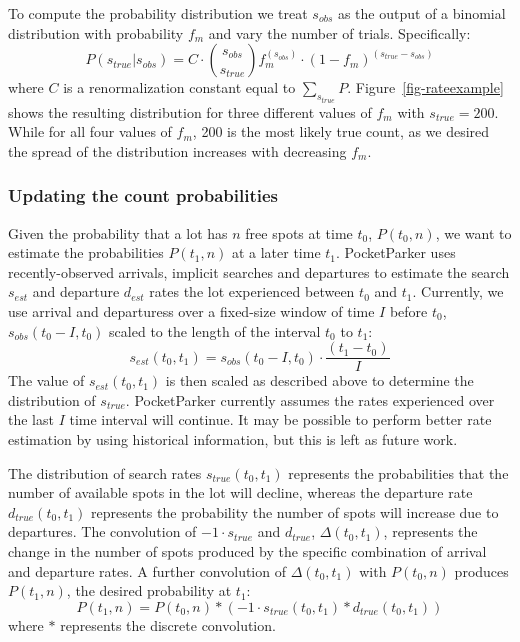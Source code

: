 To compute the probability distribution we treat $s_{obs}$ as the output of a
binomial distribution with probability $f_m$ and vary the number of trials.
Specifically:
%
\begin{equation} P(s_{true}| s_{obs}) = C \cdot {s_{obs} \choose s_{true}}
f_m^{(s_{obs})} \cdot (1 - f_m)^{(s_{true} - s_{obs})} \end{equation}
%
where $C$ is a renormalization constant equal to $\sum_{s_{true}} P$.
Figure~\ref{fig-rateexample} shows the resulting distribution for three
different values of $f_m$ with $s_{true} = 200$. While for all four values of
$f_m$, 200 is the most likely true count, as we desired the spread of the
distribution increases with decreasing $f_m$.

\subsubsection{Updating the count probabilities}

Given the probability that a lot has $n$ free spots at time $t_0$, $P(t_0,
n)$, we want to estimate the probabilities $P(t_1, n)$ at a later time $t_1$.
PocketParker uses recently-observed arrivals, implicit searches and
departures to estimate the search $s_{est}$ and departure $d_{est}$ rates the
lot experienced between $t_0$ and $t_1$. Currently, we use arrival and
departuress over a fixed-size window of time $I$ before $t_0$, $s_{obs}(t_0 -
I, t_0)$ scaled to the length of the interval $t_0$ to $t_1$:
%
\[s_{est}(t_0, t_1) = s_{obs}(t_0 - I, t_0) \cdot \frac{(t_1 - t_0)}{I} \]
%
The value of $s_{est}(t_0, t_1)$ is then scaled as described above to
determine the distribution of $s_{true}$. PocketParker currently assumes the
rates experienced over the last $I$ time interval will continue. It may be
possible to perform better rate estimation by using historical information,
but this is left as future work.

The distribution of search rates $s_{true}(t_0, t_1)$ represents the
probabilities that the number of available spots in the lot will decline,
whereas the departure rate $d_{true}(t_0, t_1)$ represents the probability
the number of spots will increase due to departures. The convolution of $-1
\cdot s_{true}$ and $d_{true}$, $\Delta(t_0, t_1)$, represents the change in
the number of spots produced by the specific combination of arrival and
departure rates. A further convolution of $\Delta(t_0, t_1)$ with $P(t_0,
n)$ produces $P(t_1, n)$, the desired probability at $t_1$:
%
\[ P(t_1, n) = P(t_0, n) * (-1 \cdot s_{true}(t_0, t_1) * d_{true}(t_0,
t_1)) \]
%
where $*$ represents the discrete convolution.

